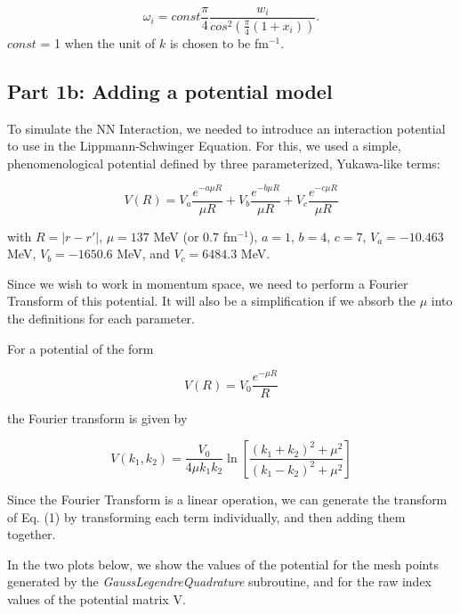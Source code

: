 \documentclass{article}
\begin{document}
\begin{multicols}{2}
\begin{equation*}
            \omega_i= const\frac{\pi}{4}\frac{w_i}{cos^2\left(\frac{\pi}{4}(1+x_i)\right)}.
\end{equation*}
$const$ = 1 when the unit of $k$ is chosen to be fm$^{-1}$. 

\subsection{Part 1b: Adding a potential model}

To simulate the NN Interaction, we needed to introduce an interaction potential to use in the Lippmann-Schwinger Equation. For this, we used a simple, phenomenological potential defined by three parameterized, Yukawa-like terms:

\begin{equation}
V(R) = V_a\frac{e^{-a\mu R}}{\mu R} + V_b\frac{e^{-b\mu R}}{\mu R} + V_c\frac{e^{-c\mu R}}{\mu R}
\end{equation}

\noindent with $R = |r-r'|$, $\mu = 137 $ MeV (or $0.7$ fm$^{-1}$), $a = 1$, $b = 4$, $c = 7$, $V_a = -10.463$ MeV, $V_b = -1650.6$ MeV, and $V_c = 6484.3$ MeV.

Since we wish to work in momentum space, we need to perform a Fourier Transform of this potential. It will also be a simplification if we absorb the $\mu$ into the definitions for each parameter.

For a potential of the form

\begin{equation}
V(R) = V_0\frac{e^{-\mu R}}{R}
\end{equation}

the Fourier transform is given by

\begin{equation}
V(k_1,k_2) = \frac{V_0}{4\mu k_1 k_2}\ln{\left[\frac{\left(k_1 + k_2\right)^2 + \mu^2}{\left(k_1 - k_2\right)^2 + \mu^2}\right]}
\end{equation}

Since the Fourier Transform is a linear operation, we can generate the transform of Eq. (1) by transforming each term individually, and then adding them together.

In the two plots below, we show the values of the potential for the mesh points generated by the \textit{GaussLegendreQuadrature} subroutine, and for the raw index values of the potential matrix V.


\end{multicols}
\end{document}
